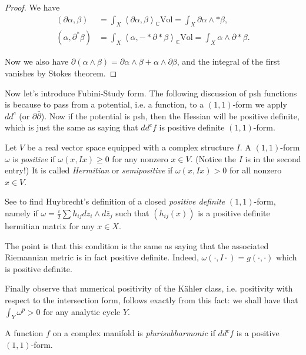 \begin{proof}
We have
\begin{align*}
(\partial\alpha,\beta)
&=\int_X\left<\partial\alpha,\beta\right>_\mathbb{C}\text{Vol}
=\int_X \partial\alpha\wedge*\beta,\\
(\alpha,\partial^*\beta)
&=\int_X\left<\alpha,-*\partial*\beta\right>_{\mathbb{C}}\text{Vol}
=\int_X\alpha\wedge\partial*\beta.
\end{align*}

\noindent
Now we also have 
$\partial(\alpha\wedge\beta)
=\partial\alpha\wedge\beta+\alpha\wedge\partial\beta$,
and the integral of the first vanishes by Stokes theorem.
\end{proof}



\noindent
Now let's introduce Fubini-Study form.
The following discussion of psh functions is because
to pass from a potential, i.e. a function,
to a $(1,1)$-form we apply $dd^c$ (or $\partial\bar\partial$).
Now if the potential is psh,
then the Hessian will be positive definite,
which is just the same as saying that
$dd^cf$ is positive definite $(1,1)$-form.

\begin{definition}
\label{definition-positive-11form}
Let $V$ be a real vector space equipped with a complex structure $I$.
A $(1,1)$-form $\omega$ is {\it positive} 
if $\omega(x,Ix)\geq 0$ for any nonzero $x \in V$.
(Notice the $I$ is in the second entry!)
It is called {\it Hermitian} or {\it semipositive} 
if $\omega(x,Ix)>0$ for all nonzero $x \in V$.
\end{definition}

\noindent
See \cite[Lemma 3.1.7]{huc}
to find Huybrecht's definition of a closed {\it positive definite} 
$(1,1)$-form, namely if
$\omega=\frac{i}{2}\sum h_{ij}dz_i \wedge d\bar{z}_j$
such that $(h_{ij}(x))$ is a positive
definite hermitian matrix for any $x \in X$.

The point is that this condition
is the same as saying that the associated
Riemannian metric is in fact positive definite.
Indeed, $\omega(\cdot,I\cdot)=g(\cdot,\cdot)$
which is positive definite.

Finally observe that numerical positivity of the
Kähler class,
i.e. positivity with respect to the intersection form,
follows exactly from this fact: we shall have that
$\int_Y \omega^p>0$ for any analytic cycle $Y$.

\begin{definition}
\label{definition-psh}
A function $f$ on a complex manifold is
{\it plurisubharmonic} if $dd^cf$ is 
a positive $(1,1)$-form.
\end{definition}

